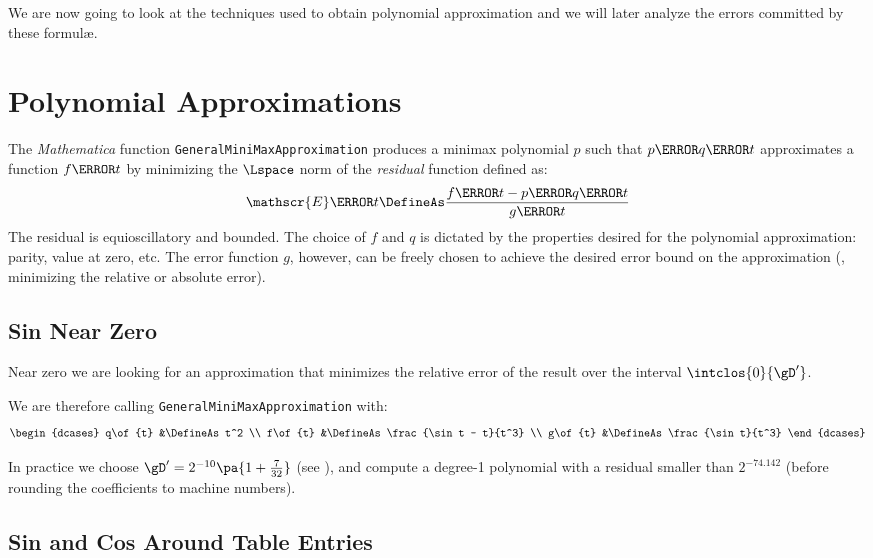 \documentclass[10pt, a4paper, twoside]{basestyle}
\begin{document}
We are now going to look at the techniques used to obtain polynomial approximation and we will later analyze the errors committed by these formulæ.

\section*{Polynomial Approximations}

The \textit{Mathematica} function \texttt{GeneralMiniMaxApproximation} produces a minimax polynomial $p$ such that $p\of{q\of{t}}$ approximates a function $f\of{t}$ by minimizing the $\Lspace$ norm of the \emph{residual} function defined as:
\[
\mathscr{E}\of{t} \DefineAs \frac{f\of{t} - p\of{q\of{t}}}{g\of{t}}
\]
The residual is equioscillatory and bounded.  The choice of $f$ and $q$ is dictated by the properties desired for the polynomial approximation: parity, value at zero, etc.  The error function $g$, however, can be freely chosen to achieve the desired error bound on the approximation (\exempligratia, minimizing the relative or absolute error).

\subsection*{Sin Near Zero}

Near zero we are looking for an approximation that minimizes the relative error of the result over the interval $\intclos{0}{\gD'}$.

We are therefore calling \texttt{GeneralMiniMaxApproximation} with:
\[
\begin{dcases}
q\of{t} &\DefineAs t^2 \\
f\of{t} &\DefineAs \frac{\sin t - t}{t^3} \\
g\of{t} &\DefineAs \frac{\sin t}{t^3}
\end{dcases}
\]

In practice we choose $\gD' = 2^{-10} \pa{1 + \frac{7}{32}}$ (see ), and compute a degree-1 polynomial with a residual smaller than $2^{-74.142}$ (before rounding the coefficients to machine numbers).

\subsection*{Sin and Cos Around Table Entries}
\end{document}
